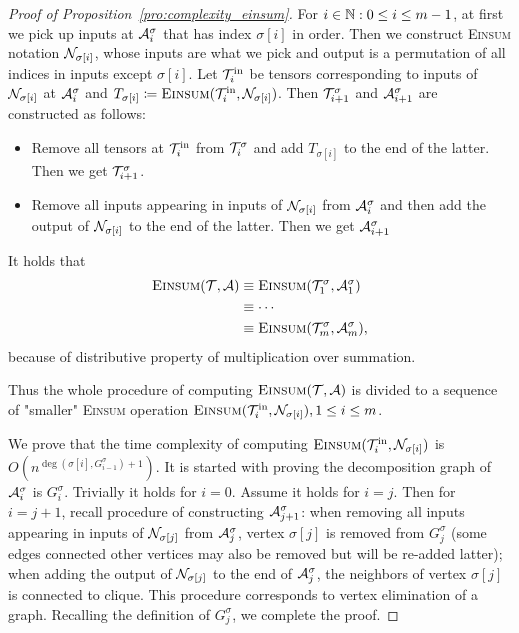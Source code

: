 \documentclass[letterpaper,11pt]{article}
\def\Einsum{\textsc{Einsum}}
\newcommand{\tensorcontraction}{\textsc{Einsum}}
\newcommand{\degp}[2]{\deg(#1,#2)}
\newcommand{\less}{O}
\begin{document}
\begin{bibunit}[plainnat]
\begin{proof}[Proof of Proposition~\ref{pro:complexity_einsum}]
For $i \in \mathbb{N}: 0 \leq i \leq m-1$, at first we pick up inputs at ${\mathcal{A}}^\sigma_i$ that has index $\sigma[i]$ in order. Then we construct \Einsum{} notation ${\mathcal{N}}_{\sigma[i]}$, whose inputs are what we pick and output is a permutation of all indices in inputs except $\sigma[i]$. Let ${\mathcal{T}}_i^{\mathrm{in}}$ be tensors corresponding to inputs of ${\mathcal{N}}_{\sigma[i]}$ at ${\mathcal{A}}^\sigma_i$ and $T_{\sigma[i]} \coloneqq \tensorcontraction(\calT_i^{\mathrm{in}}, \calN_{\sigma[i]})$. Then ${\mathcal{T}}^\sigma_{i+1}$ and  ${\mathcal{A}}^\sigma_{i+1}$ are constructed as follows:
\begin{itemize}
    \item Remove all tensors at ${\mathcal{T}}_i^{\mathrm{in}}$ from ${\mathcal{T}}^\sigma_i$ and add $T_{\sigma[i]}$ to the end of the latter. Then we get ${\mathcal{T}}^\sigma_{i+1}$. 
    \item Remove all inputs appearing in inputs of ${\mathcal{N}}_{\sigma[i]}$ from ${\mathcal{A}}^\sigma_i$ and then add the output of ${\mathcal{N}}_{\sigma[i]}$ to the end of the latter. Then we get ${\mathcal{A}}^\sigma_{i+1}$
\end{itemize}

It holds that
\begin{align*}
    \tensorcontraction(\calT, \calA) & \equiv \tensorcontraction(\calT^\sigma_1, \calA^\sigma_1) \\
    & \equiv \cdots \\
    & \equiv \tensorcontraction(\calT^\sigma_m, \calA^\sigma_m),
\end{align*}
because of distributive property of multiplication over summation. 

Thus the whole procedure of computing $\tensorcontraction(\calT, \calA)$ is divided to a sequence of "smaller" \Einsum{} operation $\tensorcontraction(\calT_i^{\mathrm{in}}, \calN_{\sigma[i]}), 1 \leq i \leq m$. 

We prove that the time complexity of computing $\tensorcontraction(\calT_i^{\mathrm{in}},\calN_{\sigma[i]})$ is $\less(n^{\degp{\sigma[i]}{G^\sigma_{i-1}}+1})$. 
It is started with proving the decomposition graph of ${\mathcal{A}}^\sigma_i$ is $G^\sigma_i$. Trivially it holds for $i=0$. Assume it holds for $i = j$. Then for $i=j+1$, recall procedure of constructing ${\mathcal{A}}^\sigma_{j+1}$: when removing all inputs appearing in inputs of ${\mathcal{N}}_{\sigma[j]}$ from ${\mathcal{A}}^\sigma_j$, vertex $\sigma[j]$ is removed from $G^\sigma_j$ (some edges connected other vertices may also be removed but will be re-added latter); when adding the output of ${\mathcal{N}}_{\sigma[j]}$ to the end of ${\mathcal{A}}^\sigma_j$, the neighbors of vertex $\sigma[j]$ is connected to clique. This procedure corresponds to vertex elimination of a graph. Recalling the definition of $G^\sigma_j$, we complete the proof. 


\end{proof}
\end{bibunit}
\end{document}

